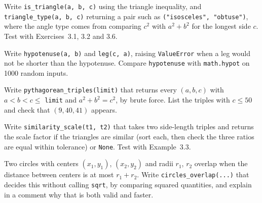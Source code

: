 \begin{codeexercises}
\item Write \lstinline!is_triangle(a, b, c)! using the triangle inequality, and \lstinline!triangle_type(a, b, c)! returning a pair such as \lstinline!("isosceles", "obtuse")!, where the angle type comes from comparing $c^2$ with $a^2 + b^2$ for the longest side $c$. Test with Exercises~3.1, 3.2 and 3.6.
\item Write \lstinline!hypotenuse(a, b)! and \lstinline!leg(c, a)!, raising \lstinline!ValueError! when a leg would not be shorter than the hypotenuse. Compare \lstinline!hypotenuse! with \lstinline!math.hypot! on 1000 random inputs.
\item Write \lstinline!pythagorean_triples(limit)! that returns every $(a, b, c)$ with $a < b < c \le$ \lstinline!limit! and $a^2 + b^2 = c^2$, by brute force. List the triples with $c \le 50$ and check that $(9, 40, 41)$ appears.
\item Write \lstinline!similarity_scale(t1, t2)! that takes two side-length triples and returns the scale factor if the triangles are similar (sort each, then check the three ratios are equal within tolerance) or \lstinline!None!. Test with Example~3.3.
\item Two circles with centers $(x_1, y_1)$, $(x_2, y_2)$ and radii $r_1$, $r_2$ overlap when the distance between centers is at most $r_1 + r_2$. Write \lstinline!circles_overlap(...)! that decides this without calling \lstinline!sqrt!, by comparing squared quantities, and explain in a comment why that is both valid and faster.
\end{codeexercises}

